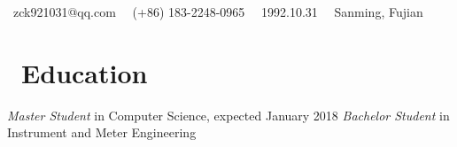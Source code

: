 \documentclass{resume}
\begin{document}
\centerline{\sffamily\large{\faEnvelope\ {zck921031@qq.com} \textperiodcentered\ \faPhone\ {(+86) 183-2248-0965} \textperiodcentered\ \faBirthdayCake\ {1992.10.31} \textperiodcentered\ \faHome\ {Sanming, Fujian}}
\vspace{1.5ex} }
 
\section{\faGraduationCap\  Education}
\textit{Master Student} in Computer Science, expected January 2018
\textit{Bachelor Student} in Instrument and Meter Engineering
\end{document}
